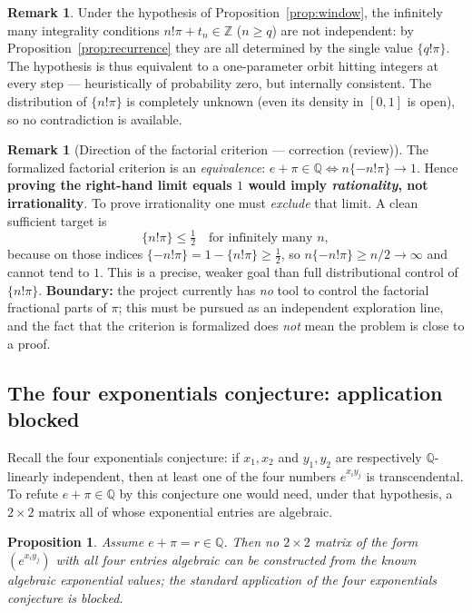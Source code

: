 \documentclass[11pt]{amsart}
\newtheorem{proposition}[theorem]{Proposition}
\theoremstyle{definition}
\newtheorem{remark}[theorem]{Remark}
\theoremstyle{remark}
\numberwithin{equation}{section}
\newcommand{\Q}{\mathbb{Q}}
\newcommand{\Z}{\mathbb{Z}}
\newcommand{\ee}{e}
\begin{document}
\begin{remark}
Under the hypothesis of Proposition~\ref{prop:window}, the infinitely many integrality conditions $n!\pi+t_n\in\Z$ ($n\ge q$) are not independent: by Proposition~\ref{prop:recurrence} they are all determined by the single value $\{q!\pi\}$. The hypothesis is thus equivalent to a one-parameter orbit hitting integers at every step --- heuristically of probability zero, but internally consistent. The distribution of $\{n!\pi\}$ is completely unknown (even its density in $[0,1]$ is open), so no contradiction is available.
\end{remark}

\begin{remark}[Direction of the factorial criterion --- correction (review)]\label{rem:factorial-direction}
The formalized factorial criterion is an \emph{equivalence}: $e+\pi\in\Q \iff n\{-n!\pi\}\to1$. Hence \textbf{proving the right-hand limit equals $1$ would imply \emph{rationality}, not irrationality}. To prove irrationality one must \emph{exclude} that limit. A clean sufficient target is
\[
\{n!\pi\}\le\tfrac12 \quad\text{for infinitely many }n,
\]
because on those indices $\{-n!\pi\}=1-\{n!\pi\}\ge\tfrac12$, so $n\{-n!\pi\}\ge n/2\to\infty$ and cannot tend to $1$. This is a precise, weaker goal than full distributional control of $\{n!\pi\}$. \textbf{Boundary:} the project currently has \emph{no} tool to control the factorial fractional parts of $\pi$; this must be pursued as an independent exploration line, and the fact that the criterion is formalized does \emph{not} mean the problem is close to a proof.
\end{remark}

\subsection{The four exponentials conjecture: application blocked}

Recall the four exponentials conjecture: if $x_1,x_2$ and $y_1,y_2$ are respectively $\Q$-linearly independent, then at least one of the four numbers $\ee^{x_iy_j}$ is transcendental. To refute $e+\pi\in\Q$ by this conjecture one would need, under that hypothesis, a $2\times2$ matrix all of whose exponential entries are algebraic.

\begin{proposition}\label{prop:four-exp}
Assume $e+\pi=r\in\Q$. Then no $2\times2$ matrix of the form $(\ee^{x_iy_j})$ with all four entries algebraic can be constructed from the known algebraic exponential values; the standard application of the four exponentials conjecture is blocked.
\end{proposition}
\end{document}
